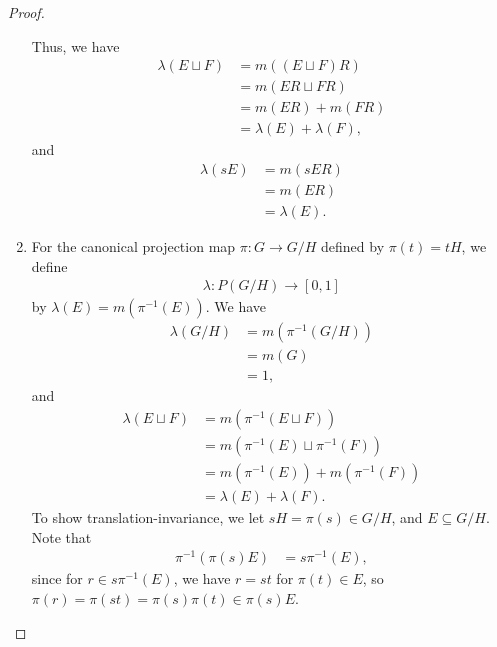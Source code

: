 \documentclass[10pt]{mypackage}
\begin{document}
\begin{proof}
\begin{enumerate}[(1)]
      Thus, we have
      \begin{align*}
        \lambda\left(E\sqcup F\right) &= m\left(\left(E\sqcup F\right)R\right)\\
                                      &= m\left(ER\sqcup FR\right)\\
                                      &= m\left(ER\right) + m\left(FR\right)\\
                                      &= \lambda(E) + \lambda(F),
      \end{align*}
      and
      \begin{align*}
        \lambda\left(sE\right) &= m\left(sER\right)\\
                               &= m\left(ER\right)\\
                               &= \lambda\left(E\right).
      \end{align*}
    \item For the canonical projection map $\pi: G\rightarrow G/H$ defined by $\pi(t) = tH$, we define
      \begin{align*}
        \lambda: P\left(G/H\right)\rightarrow [0,1]
      \end{align*}
      by $\lambda\left(E\right) = m\left(\pi^{-1}\left(E\right)\right)$. We have
      \begin{align*}
        \lambda\left(G/H\right) &= m\left(\pi^{-1}\left(G/H\right)\right)\\
                                &= m\left(G\right)\\
                                &= 1,
      \end{align*}
      and
      \begin{align*}
        \lambda\left(E\sqcup F\right) &= m\left(\pi^{-1}\left(E\sqcup F\right)\right)\\
                                      &= m\left(\pi^{-1}\left(E\right)\sqcup \pi^{-1}\left(F\right)\right)\\
                                      &= m\left(\pi^{-1}\left(E\right)\right) + m\left(\pi^{-1}\left(F\right)\right)\\
                                      &= \lambda\left(E\right) + \lambda\left(F\right).
      \end{align*}
      To show translation-invariance, we let $sH = \pi\left(s\right)\in G/H$, and $E\subseteq G/H$. Note that
      \begin{align*}
        \pi^{-1}\left(\pi\left(s\right)E\right) &= s\pi^{-1}\left(E\right),
      \end{align*}
      since for $r\in s\pi^{-1}\left(E\right)$, we have $r = st$ for $\pi(t)\in E$, so $\pi\left(r\right) = \pi\left(st\right) = \pi\left(s\right)\pi\left(t\right) \in \pi\left(s\right)E$.\newline


\end{enumerate}
\end{proof}
\end{document}
